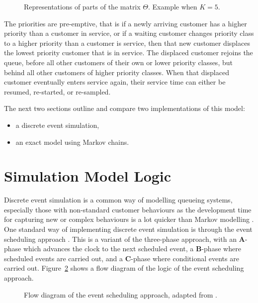 \documentclass{article}
\begin{document}
\begin{figure}
\begin{center}

\end{center}
\caption{Representations of parts of the matrix $\Theta$. Example when $K=5$.}
\label{fig:skipgrades}
\end{figure}

The priorities are pre-emptive, that is if a newly arriving customer has a
higher priority than a customer in service, or if a waiting customer changes
priority class to a higher priority than a customer is service, then that new
customer displaces the lowest priority customer that is in service. The
displaced customer rejoins the queue, before all other customers of their own or
lower priority classes, but behind all other customers of higher priority
classes. When that displaced customer eventually enters service again, their
service time can either be resumed, re-started, or re-sampled.

The next two sections outline and compare two implementations of this model:

\begin{itemize}
    \item a discrete event simulation,
    \item an exact model using Markov chains.
\end{itemize}



\section{Simulation Model Logic}\label{sec:simulation}
Discrete event simulation is a common way of modelling queueing systems,
especially those with non-standard customer behaviours as the development time
for capturing new or complex behaviours is a lot quicker than Markov modelling
\cite{standfield14}.
One standard way of implementing discrete event simulation is through the event
scheduling approach \cite{robinson14}. This is a variant of the three-phase
approach, with an \textbf{A}-phase which advances the clock to the next
scheduled event, a \textbf{B}-phase where scheduled events are carried out, and
a \textbf{C}-phase where conditional events are carried out.
Figure~\ref{fig:eventscheduling} shows a flow diagram of the logic of the event
scheduling approach.

\begin{figure}
    \centering
    
    \caption{Flow diagram of the event scheduling approach, adapted from
    \cite{palmer18}.}
    \label{fig:eventscheduling}
\end{figure}
\end{document}
